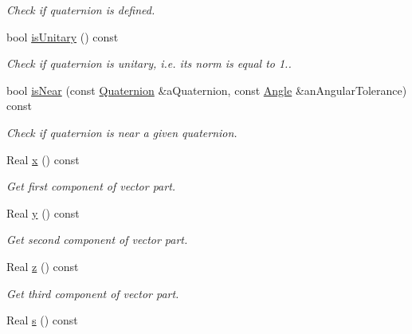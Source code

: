 \begin{DoxyCompactItemize}
\begin{DoxyCompactList}\small\item\em Check if quaternion is defined. \end{DoxyCompactList}\item 
bool \hyperlink{classlibrary_1_1math_1_1geom_1_1d3_1_1trf_1_1rot_1_1_quaternion_a648cc398273622634b43aab3472dfe09}{is\+Unitary} () const
\begin{DoxyCompactList}\small\item\em Check if quaternion is unitary, i.\+e. its norm is equal to 1.. \end{DoxyCompactList}\item 
bool \hyperlink{classlibrary_1_1math_1_1geom_1_1d3_1_1trf_1_1rot_1_1_quaternion_ac335110e3bc152b22d76a2e980242619}{is\+Near} (const \hyperlink{classlibrary_1_1math_1_1geom_1_1d3_1_1trf_1_1rot_1_1_quaternion}{Quaternion} \&a\+Quaternion, const \hyperlink{classlibrary_1_1math_1_1geom_1_1_angle}{Angle} \&an\+Angular\+Tolerance) const
\begin{DoxyCompactList}\small\item\em Check if quaternion is near a given quaternion. \end{DoxyCompactList}\item 
Real \hyperlink{classlibrary_1_1math_1_1geom_1_1d3_1_1trf_1_1rot_1_1_quaternion_ada0e80b8fe8015f8e8ab4398bba947e1}{x} () const
\begin{DoxyCompactList}\small\item\em Get first component of vector part. \end{DoxyCompactList}\item 
Real \hyperlink{classlibrary_1_1math_1_1geom_1_1d3_1_1trf_1_1rot_1_1_quaternion_ab5cf19d1e8bb53d2d019c3949e0b428e}{y} () const
\begin{DoxyCompactList}\small\item\em Get second component of vector part. \end{DoxyCompactList}\item 
Real \hyperlink{classlibrary_1_1math_1_1geom_1_1d3_1_1trf_1_1rot_1_1_quaternion_a855911876f8f59e446740071d0a8194a}{z} () const
\begin{DoxyCompactList}\small\item\em Get third component of vector part. \end{DoxyCompactList}\item 
Real \hyperlink{classlibrary_1_1math_1_1geom_1_1d3_1_1trf_1_1rot_1_1_quaternion_a9dd9ab9d3e3474d5a7dd038bb4160a94}{s} () const
\item 

\end{DoxyCompactItemize}
